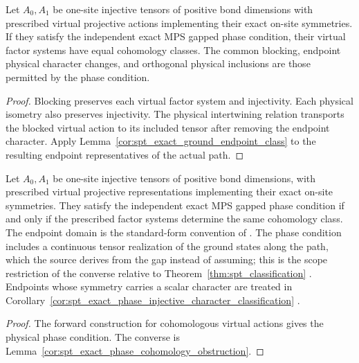 \begin{lemma}
    \label{cor:spt_exact_phase_cohomology_obstruction}
    \leanok
    Let $A_0,A_1$ be one-site injective tensors of positive bond dimensions
    with prescribed virtual projective actions implementing their exact
    on-site symmetries. If they satisfy the independent exact MPS gapped
    phase condition, their virtual factor systems have equal cohomology
    classes. The common blocking, endpoint physical character changes,
    and orthogonal physical inclusions are those permitted by the phase
    condition.
\end{lemma}
\begin{proof}\leanok
    Blocking preserves each virtual factor system and injectivity.
    Each physical isometry also preserves injectivity. The physical
    intertwining relation transports the blocked virtual action to its
    included tensor after removing the endpoint character. Apply
    Lemma~\ref{cor:spt_exact_ground_endpoint_class} to the resulting
    endpoint representatives of the actual path.
\end{proof}

\begin{theorem}
    \label{thm:spt_exact_phase_injective_classification}
    \leanok
    Let $A_0,A_1$ be one-site injective tensors of positive bond dimensions,
    with prescribed virtual projective representations implementing their
    exact on-site symmetries. They satisfy the independent exact MPS gapped
    phase condition if and only if the prescribed factor systems determine
    the same cohomology class. The endpoint domain is the standard-form
    convention of \cite[Section~II.F]{Schuch2011Phases}. The phase condition
    includes a continuous tensor realization of the ground states along the
    path, which the source derives from the gap instead of assuming; this is
    the scope restriction of the converse relative to
    Theorem~\ref{thm:spt_classification}
    \cite{gap:spc11_spt_classification_continuous_realization}.
    Endpoints whose symmetry carries a scalar character are treated in
    Corollary~\ref{cor:spt_exact_phase_injective_character_classification}
    \cite{gap:spc11_spt_interpolation_upper_range}.
\end{theorem}
\begin{proof}\leanok
    The forward construction for cohomologous virtual actions gives the
    physical phase condition. The converse is
    Lemma~\ref{cor:spt_exact_phase_cohomology_obstruction}.
\end{proof}

